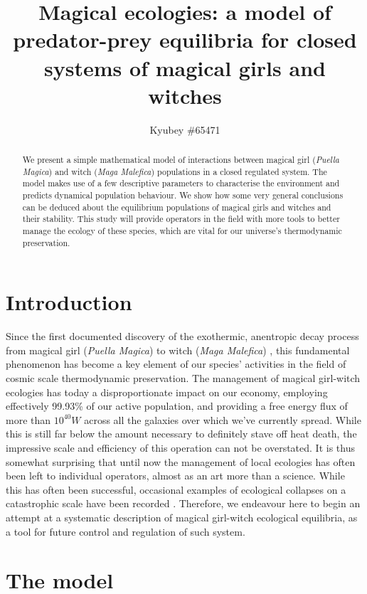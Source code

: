\documentclass[]{article}
\title{Magical ecologies: a model of predator-prey equilibria for closed systems of magical girls and witches}
\author{Kyubey \#65471}
\begin{document}
\maketitle

\begin{abstract}
	We present a simple mathematical model of interactions between magical girl (\textit{Puella Magica}) and witch (\textit{Maga Malefica}) populations in a closed regulated system. The model makes use of a few descriptive parameters to characterise the environment and predicts dynamical population behaviour. We show how some very general conclusions can be deduced about the equilibrium populations of magical girls and witches and their stability. This study will provide operators in the field with more tools to better manage the ecology of these species, which are vital for our universe's thermodynamic preservation. 
\end{abstract}

\section{Introduction}

Since the first documented discovery of the exothermic, anentropic decay process from magical girl (\textit{Puella Magica}) to witch (\textit{Maga Malefica}) \cite{kyubey1}, this fundamental phenomenon has become a key element of our species' activities in the field of cosmic scale thermodynamic preservation. The management of magical girl-witch ecologies has today a disproportionate impact on our economy, employing effectively 99.93\% of our active population, and providing a free energy flux of more than $10^{40} W$ across all the galaxies over which we've currently spread. While this is still far below the amount necessary to definitely stave off heat death, the impressive scale and efficiency of this operation can not be overstated. It is thus somewhat surprising that until now the management of local ecologies has often been left to individual operators, almost as an art more than a science. While this has often been successful, occasional examples of ecological collapses on a catastrophic scale have been recorded \cite{kyubey2}. Therefore, we endeavour here to begin an attempt at a systematic description of magical girl-witch ecological equilibria, as a tool for future control and regulation of such system.

\section{The model}
\end{document}
